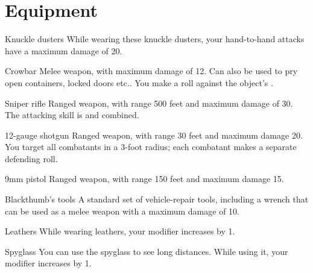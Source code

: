 
\section{Equipment}

\begin{describe}{Knuckle dusters}
  While wearing these knuckle dusters, your hand-to-hand attacks have a maximum damage of 20.
\end{describe}

\begin{describe}{Crowbar}
  Melee weapon, with maximum damage of 12. Can also be used to pry open containers, locked doors etc.. You make a  roll against the object's .
\end{describe}

\begin{describe}{Sniper rifle}
  Ranged weapon, with range 500 feet and maximum damage of 30. The attacking skill is  and  combined.
\end{describe}

\begin{describe}{12-gauge shotgun}
  Ranged weapon, with range 30 feet and maximum damage 20. You target all combatants in a 3-foot radius; each combatant makes a separate defending roll.
\end{describe}

\begin{describe}{9mm pistol}
  Ranged weapon, with range 150 feet and maximum damage 15.
\end{describe}

\begin{describe}{Blackthumb's tools}
  A standard set of vehicle-repair tools, including a wrench that can be used as a melee weapon with a maximum damage of 10.
\end{describe}

\begin{describe}{Leathers}
  While wearing leathers, your  modifier increases by 1.
\end{describe}

\begin{describe}{Spyglass}
  You can use the spyglass to see long distances. While using it, your  modifier increases by 1.
\end{describe}

